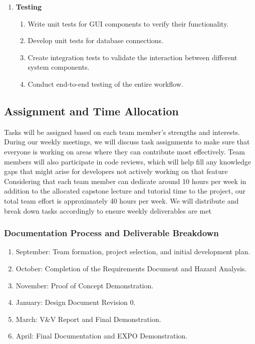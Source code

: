 \documentclass{article}
\begin{document}
\begin{enumerate}
    \item \textbf{Testing}
    \begin{enumerate}[label=\alph*)]
        \item Write unit tests for GUI components to verify their functionality.
        \item Develop unit tests for database connections.
        \item Create integration tests to validate the interaction between different system components.
        \item Conduct end-to-end testing of the entire workflow.
    \end{enumerate}
\end{enumerate}

\subsection{Assignment and Time Allocation}

Tasks will be assigned based on each team member’s strengths and interests. During our weekly meetings, we will discuss task assignments to make sure that everyone is working on areas where they can contribute most effectively. Team members will also participate in code reviews, which will help fill any knowledge gaps that might arise for developers not actively working on that feature
\newline
\\
Considering that each team member can dedicate around 10 hours per week in addition to the allocated capstone lecture and tutorial time to the project, our total team effort is approximately 40 hours per week. We will distribute and break down tasks accordingly to ensure weekly deliverables are met

\subsubsection{Documentation Process and Deliverable Breakdown}

\begin{enumerate}
    \item September: Team formation, project selection, and initial development plan.
    \item October: Completion of the Requirements Document and Hazard Analysis.
    \item November: Proof of Concept Demonstration.
    \item January: Design Document Revision 0.
    \item March: V\&V Report and Final Demonstration.
    \item April: Final Documentation and EXPO Demonstration.
\end{enumerate}
\end{document}

